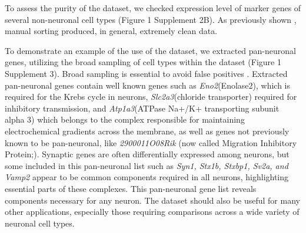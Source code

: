 To assess the purity of the dataset, we checked expression level of marker genes of several non-neuronal cell types (Figure 1 Supplement 2B). As previously shown \citep{Okaty_2011}, manual sorting produced, in general, extremely clean data.

 To demonstrate an example of the use of the dataset, we extracted pan-neuronal genes, utilizing the broad sampling of cell types within the dataset (Figure 1 Supplement 3). Broad sampling is essential to avoid false positives \citep{Zhang_2014,Mo_2015,Stefanakis_2015}. Extracted pan-neuronal genes contain well known genes such as \textit{Eno2}(Enolase2), which is required for the Krebs cycle in neurons, \textit{Slc2a3}(chloride transporter) required for inhibitory transmission, and \textit{Atp1a3}(ATPase Na+/K+ transporting subunit alpha 3) which belongs to the complex responsible for maintaining electrochemical gradients across the membrane, as well as genes not previously known to be pan-neuronal, like \textit{2900011O08Rik} (now called Migration Inhibitory Protein;\cite{Zhang_2014a}). Synaptic genes are often differentially expressed among neurons, but some included in this pan-neuronal list such as \textit{Syn1, Stx1b, Stxbp1, Sv2a, and Vamp2} appear to be common components required in all neurons, highlighting essential parts of these complexes. This pan-neuronal gene list reveals components necessary for any neuron. The dataset should also be useful for many other applications, especially those requiring comparisons across a wide variety of neuronal cell types. 


